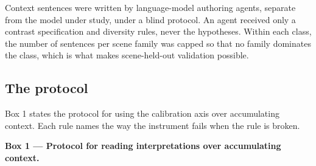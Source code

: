 \documentclass[11pt]{article}
\begin{document}
Context sentences were written by language-model authoring agents, separate from the
model under study, under a blind protocol. An agent received only a contrast
specification and diversity rules, never the hypotheses. Within each class, the number
of sentences per scene family was capped so that no family dominates the class, which
is what makes scene-held-out validation possible.

\subsection{The protocol}

Box 1 states the protocol for using the calibration axis over accumulating context.
Each rule names the way the instrument fails when the rule is broken.

\textbf{Box 1 — Protocol for reading interpretations over accumulating context.}
\end{document}
